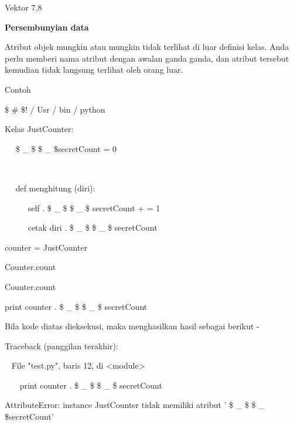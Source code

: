 \begin{12pt}
\begin{12pt}
\begin{12pt}
\begin{12pt}
\begin{12pt}
\begin{12pt}
\begin{12pt}
\begin{12pt}
\begin{12pt}
\begin{12pt}
\begin{12pt}
\begin{12pt}
\begin{12pt}
\begin{12pt}
\begin{12pt}
\begin{12pt}
\begin{12pt}
\begin{12pt}
\begin{12pt}
\begin{12pt}
\begin{12pt}
\begin{12pt}
\begin{12pt}
\begin{12pt}
{\noindent 
Vektor {7,8} \par
\vspace{12pt}
\noindent 
{\fontsize{14pt}{14pt}\selectfont \textbf{Persembunyian data} \\} \par
\vspace{12pt}
Atribut objek mungkin atau mungkin tidak terlihat di luar definisi kelas. Anda perlu memberi nama atribut dengan awalan ganda ganda, dan atribut tersebut kemudian tidak langsung terlihat oleh orang luar. \par
Contoh \par
\vspace{12pt}
\noindent 
 \$  \#  \$! / Usr / bin / python \par
\vspace{12pt}
\noindent 
Kelas JustCounter: \par
\noindent 
~~  \$  \_  \$ \$  \_  \$secretCount = 0 \par
\noindent 
~  \par
\noindent 
~~ def menghitung (diri): \par
\noindent 
~~~~~ self . \$  \_  \$ \$  \_  \$ secretCount + = 1 \par
\noindent 
~~~~~ cetak diri . \$  \_  \$ \$  \_  \$ secretCount \par
\vspace{12pt}
\noindent 
counter = JustCounter {} \par
\noindent 
Counter.count {} \par
\noindent 
Counter.count {} \par
\noindent 
print counter . \$  \_  \$ \$  \_  \$ secretCount \par
\vspace{12pt}
\noindent 
Bila kode diatas dieksekusi, maka menghasilkan hasil sebagai berikut - \par
\vspace{12pt}
 \par
{} \par
\noindent 
Traceback (panggilan terakhir): \par
\noindent 
~ File "test.py", baris 12, di <module> \par
\noindent 
~~~ print counter . \$  \_  \$ \$  \_  \$ secretCount \par
\noindent 
AttributeError: instance JustCounter tidak memiliki atribut ' \$  \_  \$ \$  \_  \$secretCount' \par
\vspace{12pt}
}
\end{12pt}
\end{12pt}
\end{12pt}
\end{12pt}
\end{12pt}
\end{12pt}
\end{12pt}
\end{12pt}
\end{12pt}
\end{12pt}
\end{12pt}
\end{12pt}
\end{12pt}
\end{12pt}
\end{12pt}
\end{12pt}
\end{12pt}
\end{12pt}
\end{12pt}
\end{12pt}
\end{12pt}
\end{12pt}
\end{12pt}
\end{12pt}
